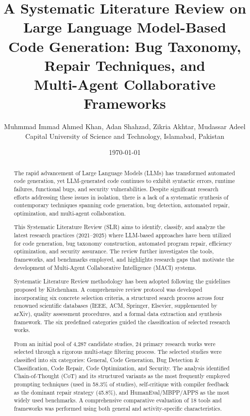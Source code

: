 \documentclass[11pt,a4paper]{article}
\title{\textbf{A Systematic Literature Review on Large Language Model-Based \\
Code Generation: Bug Taxonomy, Repair Techniques, and \\
Multi-Agent Collaborative Frameworks}}
\author{
Muhmmad Immad Ahmed Khan, Adan Shahzad, Zikria Akhtar, Mudassar Adeel  \\   
\small Capital University of Science and Technology, Islamabad, Pakistan \\
}
\date{\today}
\begin{document}
\maketitle

\begin{abstract}
\noindent
 The rapid advancement of Large Language Models (LLMs) has transformed automated code generation, yet LLM-generated code continues to exhibit syntactic errors, runtime failures, functional bugs, and security vulnerabilities. Despite significant research efforts addressing these issues in isolation, there is a lack of a systematic synthesis of contemporary techniques spanning code generation, bug detection, automated repair, optimization, and multi-agent collaboration.

\noindent
This Systematic Literature Review (SLR) aims to identify, classify, and analyze the latest research practices (2021--2025) where LLM-based approaches have been utilized for code generation, bug taxonomy construction, automated program repair, efficiency optimization, and security assurance. The review further investigates the tools, frameworks, and benchmarks employed, and highlights research gaps that motivate the development of Multi-Agent Collaborative Intelligence (MACI) systems.

\noindent
 Systematic Literature Review methodology has been adopted following the guidelines proposed by Kitchenham. A comprehensive review protocol was developed incorporating six concrete selection criteria, a structured search process across four renowned scientific databases (IEEE, ACM, Springer, Elsevier, supplemented by arXiv), quality assessment procedures, and a formal data extraction and synthesis framework. The six predefined categories guided the classification of selected research works.

\noindent
 From an initial pool of 4{,}287 candidate studies, 24 primary research works were selected through a rigorous multi-stage filtering process. The selected studies were classified into six categories: General, Code Generation, Bug Detection \& Classification, Code Repair, Code Optimization, and Security. The analysis identified Chain-of-Thought (CoT) and its structured variants as the most frequently employed prompting techniques (used in 58.3\% of studies), self-critique with compiler feedback as the dominant repair strategy (45.8\%), and HumanEval/MBPP/APPS as the most widely used benchmarks. A comprehensive comparative evaluation of 18 tools and frameworks was performed using both general and activity-specific characteristics.


\end{abstract}
\end{document}
